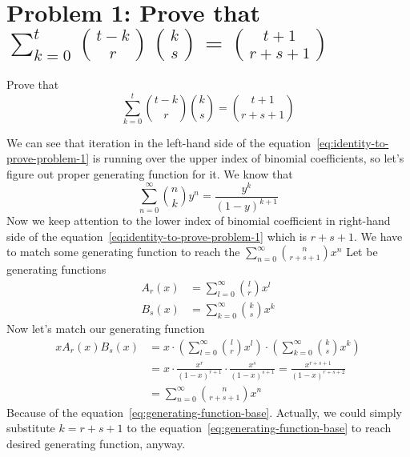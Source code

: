 ﻿\section{Problem 1: Prove that $\sum_{k=0}^{t} \binom{t-k}{r} \binom{k}{s} = \binom{t+1}{r+s+1}$}
\label{sec:problem-1-column-summation-of-two-binomial-coefficients-mse}
Prove that
\begin{equation}
    \sum_{k=0}^{t} \binom{t-k}{r} \binom{k}{s} = \binom{t+1}{r+s+1}
    \label{eq:identity-to-prove-problem-1}
\end{equation}

We can see that iteration in the left-hand side of the equation~\eqref{eq:identity-to-prove-problem-1} is running
over the upper index of binomial coefficients, so let's figure out proper generating function for it.
We know that
\begin{equation}
    \sum_{n=0}^{\infty} \binom{n}{k} y^n = \frac{y^k}{(1-y)^{k+1}}\label{eq:generating-function-base}
\end{equation}
Now we keep attention to the lower index of binomial coefficient in right-hand side
of the equation~\eqref{eq:identity-to-prove-problem-1} which is $r+s+1$.
We have to match some generating function to reach the $\sum_{n=0}^{\infty} \binom{n}{r+s+1} x^n$
Let be generating functions
\begin{align*}
    A_r(x) &= \sum_{l=0}^{\infty} \binom{l}{r} x^l\\
    B_s(x) &= \sum_{k=0}^{\infty} \binom{k}{s} x^k
\end{align*}
Now let's match our generating function
\begin{align*}
    x A_r(x) B_s(x)
    &= x \cdot \left( \sum_{l=0}^{\infty} \binom{l}{r} x^l \right) \cdot \left( \sum_{k=0}^{\infty} \binom{k}{s} x^k \right) \\
    &= x \cdot \frac{x^r}{(1-x)^{r+1}} \cdot \frac{x^s}{(1-x)^{s+1}} = \frac{x^{r+s+1}}{(1-x)^{r+s+2}} \\
    &= \sum_{n=0}^{\infty} \binom{n}{r+s+1} x^n
\end{align*}
Because of the equation~\eqref{eq:generating-function-base}.
Actually, we could simply substitute $k=r+s+1$ to the equation~\eqref{eq:generating-function-base} to reach desired
generating function, anyway.

